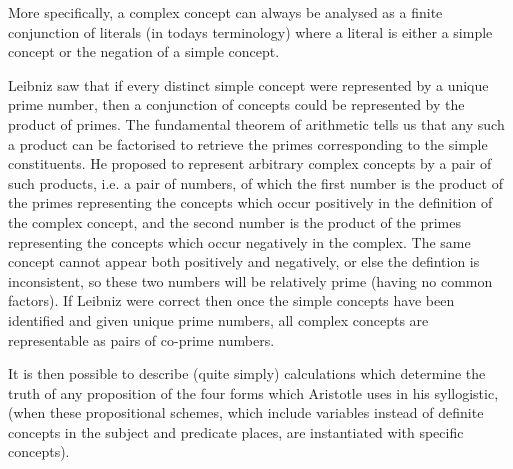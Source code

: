 More specifically, a complex concept can always be analysed as a finite conjunction of literals (in todays terminology) where a literal is either a simple concept or the negation of a simple concept.

Leibniz saw that if every distinct simple concept were represented by a unique prime number, then a conjunction of concepts could be represented by the product of primes.
The fundamental theorem of arithmetic tells us that any such a product can be factorised to retrieve the primes corresponding to the simple constituents.
He proposed to represent arbitrary complex concepts by a pair of such products, i.e. a pair of numbers, of which the first number is the product of the primes representing the concepts which occur positively in the definition of the complex concept, and the second number is the product of the primes representing the concepts which occur negatively in the complex.
The same concept cannot appear both positively and negatively, or else the defintion is inconsistent, so these two numbers will be relatively prime (having no common factors).
If Leibniz were correct then once the simple concepts have been identified and given unique prime numbers, all complex concepts are representable as pairs of co-prime numbers.

It is then possible to describe (quite simply) calculations which determine the truth of any proposition of the four forms which Aristotle uses in his syllogistic, (when these propositional schemes, which include variables instead of definite concepts in the subject and predicate places, are instantiated with specific concepts).







 

